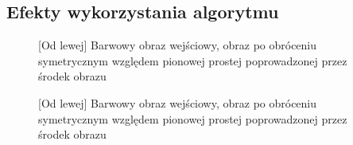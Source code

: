 \documentclass[a4paper,12pt, titlepage]{report}
\begin{document}
\subsection*{Efekty wykorzystania algorytmu}
\begin{figure}[h]
    \centering
    \caption{[Od lewej] Barwowy obraz wejściowy, obraz po obróceniu symetrycznym względem pionowej prostej poprowadzonej przez środek obrazu}%
    \label{fig:rysunek}%
\end{figure}
\FloatBarrier
\begin{figure}[h]
    \centering
    \caption{[Od lewej] Barwowy obraz wejściowy, obraz po obróceniu symetrycznym względem pionowej prostej poprowadzonej przez środek obrazu}%
    \label{fig:rysunek}%
\end{figure}
\FloatBarrier
\end{document}
